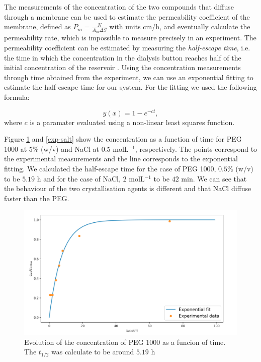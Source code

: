 \documentclass[11ptm,oneside,a4paper]{report}
\def\be{\begin{equation}}
\def\ee{\end{equation}}
\begin{document}
The measurements of the concentration of the two compounds that diffuse through a membrane 
can be used to estimate the permeability coefficient of the membrane, defined as 
$P_m = \frac{N}{A_m \Delta S}$ with units cm/h, and eventually calculate the permeability rate, which is impossible to measure precisely in an experiment. 
The permeability coefficient can be estimated by measuring the 
\textit{half-escape time}, 
i.e. the time in which the concentration in the dialysis button reaches half of the initial concentration of the reservoir \cite{pmid4889148}. Using the concentration measurements through time obtained from the experiment, we can use an
exponential fitting to estimate the half-escape time for our system. For the fitting we used the following formula:

\be
  y(x) = 1 - e^{-ct}, 
\ee
where $c$ is a paramater evaluated using a non-linear least squares function. 

Figure \ref{exp-peg1000} and
\ref{exp-salt} show the concentration  as a function of time for PEG 1000 at $5\%$ (w/v) and NaCl at $0.5$ molL$^{-1}$, respectively. The points correspond to the experimental measurements and the line corresponds to the exponential fitting. We calculated the half-escape time for the case of PEG 1000, $0.5\%$ (w/v) to be $5.19$ h and for the case of NaCl, $2$ molL$^{-1}$ to be $42$ min. We can see that the behaviour of the two crystallisation agents is different and that NaCl diffuse faster than the PEG.

\begin{figure}[t]
  \begin{center}
  \includegraphics[scale=0.25]{figures/exponentional_fit_PEG1000.png}
      \caption{Evolution of the concentration of PEG 1000 as a funcion of time. The $t_{1/2}$ was calculate to be around $5.19$ h \label{exp-peg1000}}  
  \end{center} 

\end{figure}
\noindent 
\end{document}
